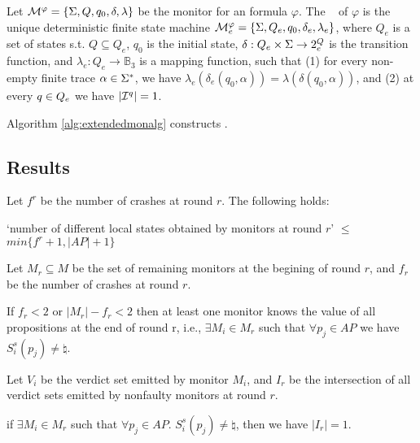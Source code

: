 \begin{definition}
 Let $\mathcal{M}^\varphi = \{ \Sigma, Q, q_0, \delta , \lambda\}$ be the \LTLtri monitor for an \LTL formula $\varphi$. The \Exltl~ of $\varphi$ is the unique deterministic finite state machine $\mathcal{M}^\varphi_e = \{ \Sigma, Q_e, q_0, \delta_e , \lambda_e\}$, where $Q_e$ is a set of states s.t. $Q \subseteq Q_e$, $q_0$ is the initial state, $\delta: Q_e \times \Sigma \rightarrow 2^Q_e $ is the transition function, and $\lambda_e : Q_e \rightarrow \mathbb{B}_3 $ is a mapping function, such that (1) for every non-empty finite trace $\alpha \in \Sigma^*$, we have $\lambda_e (\delta_e(q_0, \alpha)) = \lambda (\delta(q_0, \alpha))$, and (2) at every $q \in Q_e$ we have $|\mathcal{I}^q| = 1$.
\end{definition}

Algorithm \ref{alg:extendedmonalg} constructs \Exltl. 







\newpage

\subsection*{Results}




\begin{lemma}
Let $f^r$ be the number of crashes at round $r$. The following holds:

`number of different local states obtained by monitors at round $r$' $\leq$ $min\{f^r+1, |AP|+1\}$
\end{lemma}


Let $M_r \subseteq M$ be the set of remaining monitors at the begining of round $r$, and $f_r$ be the number of crashes at round $r$.

\begin{lemma}
If $f_r<2$ or $|M_r| - f_r<2$ then at least one monitor knows the value of all propositions at the end of round r, i.e., $\exists M_i \in M_r$ such that  $\forall p_j \in AP$ we have $S^s_i(p_j) \neq \natural$. 
\end{lemma}


Let $V_i$ be the verdict set emitted by monitor $M_i$, and $I_r$ be the intersection of all verdict sets emitted by nonfaulty monitors at round $r$. 

\begin{lemma}
if $\exists M_i\in M_r$ such that  $\forall p_j\in AP$. $S^s_i(p_j) \neq \natural$, then we have $|I_r|=1$.
\end{lemma}


